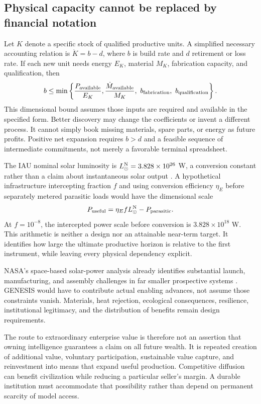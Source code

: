 \documentclass[11pt,letterpaper]{article}
\theoremstyle{remark}\newtheorem{remark}{Remark}[section]
\begin{document}
\FloatBarrier
\subsection{Physical capacity cannot be replaced by financial notation}
Let $K$ denote a specific stock of qualified productive units. A simplified necessary accounting relation is $\dot K=b-d$, where $b$ is build rate and $d$ retirement or loss rate. If each new unit needs energy $E_K$, material $M_K$, fabrication capacity, and qualification, then
\begin{equation}
b\leq\min\left\{\frac{P_{\rm available}}{E_K},\frac{\dot M_{\rm available}}{M_K},\ b_{\rm fabrication},\ b_{\rm qualification}\right\}.
\label{eq:physical}
\end{equation}
This dimensional bound assumes those inputs are required and available in the specified form. Better discovery may change the coefficients or invent a different process. It cannot simply book missing materials, spare parts, or energy as future profits. Positive net expansion requires $b>d$ and a feasible sequence of intermediate commitments, not merely a favorable terminal spreadsheet.

The IAU nominal solar luminosity is $L_\odot^{\rm N}=3.828\times10^{26}$ W, a conversion constant rather than a claim about instantaneous solar output \citep{iau}. A hypothetical infrastructure intercepting fraction $f$ and using conversion efficiency $\eta_E$ before separately metered parasitic loads would have the dimensional scale
\begin{equation}
P_{\rm useful}=\eta_E f L_\odot^{\rm N}-P_{\rm parasitic}.
\label{eq:stellar}
\end{equation}
At $f=10^{-8}$, the intercepted power scale before conversion is $3.828\times10^{18}$ W. This arithmetic is neither a design nor an attainable near-term target. It identifies how large the ultimate productive horizon is relative to the first instrument, while leaving every physical dependency explicit.

NASA's space-based solar-power analysis already identifies substantial launch, manufacturing, and assembly challenges in far smaller prospective systems \citep{nasa}. GENESIS would have to contribute actual enabling advances, not assume those constraints vanish. Materials, heat rejection, ecological consequences, resilience, institutional legitimacy, and the distribution of benefits remain design requirements.

The route to extraordinary enterprise value is therefore not an assertion that owning intelligence guarantees a claim on all future wealth. It is repeated creation of additional value, voluntary participation, sustainable value capture, and reinvestment into means that expand useful production. Competitive diffusion can benefit civilization while reducing a particular seller's margin. A durable institution must accommodate that possibility rather than depend on permanent scarcity of model access.
\end{document}
